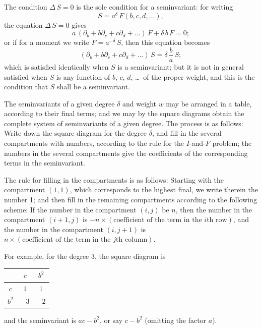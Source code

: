 \documentclass[11pt,a4paper]{book}
\begin{document}
{{{\setcounter{art}{36}
\begin{art}
The condition $\Delta\,S = 0$ is the sole condition for a seminvariant: for writing
\[
S = a^{\delta}\,F(b, c, d, \ldots),
\]
the equation $\Delta\,S = 0$ gives
\[
a\,(\partial_{b} + b\partial_{c} + c\partial_{d} + \ldots)\,F + \delta\,b\,F = 0;
\]
or if for a moment we write $F = a^{-\delta}\,S$, then this equation becomes
\[
(\partial_{b} + b\partial_{c} + c\partial_{d} + \ldots)\,S = \delta\,\frac{b}{a}\,S;
\]
which is satisfied identically when $S$ is a seminvariant; but it is not in general satisfied when $S$ is any function of $b$, $c$, $d$, \ldots\ of the proper weight, and this is the condition that $S$ shall be a seminvariant.
\end{art}

\setcounter{art}{37}
\begin{art}
The seminvariants of a given degree $\delta$ and weight $w$ may be arranged in a table, according to their final terms; and we may by the square diagrams obtain the complete system of seminvariants of a given degree. The process is as follows: Write down the square diagram for the degree $\delta$, and fill in the several compartments with numbers, according to the rule for the $I$-and-$F$ problem; the numbers in the several compartments give the coefficients of the corresponding terms in the seminvariant.
\end{art}

\setcounter{art}{38}
\begin{art}
The rule for filling in the compartments is as follows: Starting with the compartment $(1, 1)$, which corresponds to the highest final, we write therein the number 1; and then fill in the remaining compartments according to the following scheme: If the number in the compartment $(i, j)$ be $n$, then the number in the compartment $(i + 1, j)$ is $-n \times (\text{coefficient of the term in the $i$th row})$, and the number in the compartment $(i, j + 1)$ is $n \times (\text{coefficient of the term in the $j$th column})$.
\end{art}

\setcounter{art}{39}
\begin{art}
For example, for the degree 3, the square diagram is
\begin{center}
\begin{tabular}{c|cc}
 & $c$ & $b^{2}$ \\
\hline
$c$ & $1$ & $1$ \\
$b^{2}$ & $-3$ & $-2$ \\
\end{tabular}
\end{center}
and the seminvariant is $ac - b^{2}$, or say $c - b^{2}$ (omitting the factor $a$).
\end{art}

}}}
\end{document}
